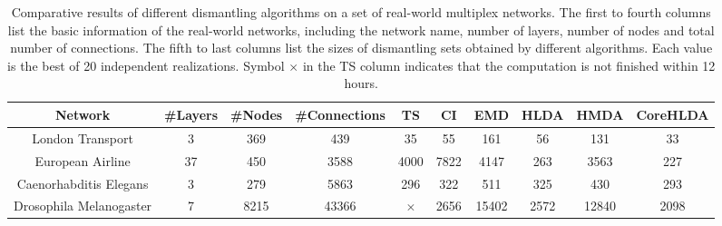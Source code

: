 \documentclass[%
 aip,
 cha,
 amsmath,amssymb,
 reprint,%
]{revtex4-1}
\begin{document}
\begin{table*}
\caption{\label{tab:table1}Comparative results of different dismantling algorithms on a set of real-world multiplex networks. The first to fourth columns list the basic information of the real-world networks, including the network name, number of layers, number of nodes and total number of connections. The fifth to last columns list the sizes of dismantling sets obtained by different algorithms. Each value is the best of 20 independent realizations. Symbol $\times$ in the TS column indicates that the computation is not finished within 12 hours.}
\begin{ruledtabular}
\begin{tabular}{cccccccccc}
 Network & \#Layers & \#Nodes & \#Connections & TS & CI & EMD & HLDA & HMDA & CoreHLDA\\ \hline
 London Transport & 3 & 369 & 439 & 35 & 55 & 161 & 56 & 131 & 33 \\
 European Airline & 37 & 450 & 3588 & 4000 & 7822 & 4147 & 263 & 3563 & 227\\
 Caenorhabditis Elegans & 3 & 279 & 5863 & 296 & 322 & 511 & 325 & 430 & 293\\
 Drosophila Melanogaster & 7 & 8215 & 43366 & $\times$ & 2656 & 15402 & 2572 & 12840 & 2098\\
\end{tabular}
\end{ruledtabular}
\end{table*}

\end{document}
